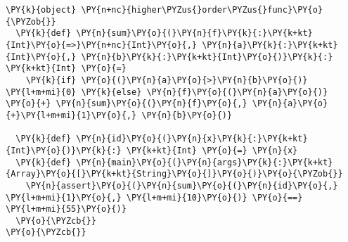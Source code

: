 \begin{Verbatim}[commandchars=\\\{\}]
\PY{k}{object} \PY{n+nc}{higher\PYZus{}order\PYZus{}func}\PY{o}{\PYZob{}}
  \PY{k}{def} \PY{n}{sum}\PY{o}{(}\PY{n}{f}\PY{k}{:}\PY{k+kt}{Int}\PY{o}{=>}\PY{n+nc}{Int}\PY{o}{,} \PY{n}{a}\PY{k}{:}\PY{k+kt}{Int}\PY{o}{,} \PY{n}{b}\PY{k}{:}\PY{k+kt}{Int}\PY{o}{)}\PY{k}{:} \PY{k+kt}{Int} \PY{o}{=}
    \PY{k}{if} \PY{o}{(}\PY{n}{a}\PY{o}{>}\PY{n}{b}\PY{o}{)} \PY{l+m+mi}{0} \PY{k}{else} \PY{n}{f}\PY{o}{(}\PY{n}{a}\PY{o}{)} \PY{o}{+} \PY{n}{sum}\PY{o}{(}\PY{n}{f}\PY{o}{,} \PY{n}{a}\PY{o}{+}\PY{l+m+mi}{1}\PY{o}{,} \PY{n}{b}\PY{o}{)}
  
  \PY{k}{def} \PY{n}{id}\PY{o}{(}\PY{n}{x}\PY{k}{:}\PY{k+kt}{Int}\PY{o}{)}\PY{k}{:} \PY{k+kt}{Int} \PY{o}{=} \PY{n}{x}
  \PY{k}{def} \PY{n}{main}\PY{o}{(}\PY{n}{args}\PY{k}{:}\PY{k+kt}{Array}\PY{o}{[}\PY{k+kt}{String}\PY{o}{]}\PY{o}{)}\PY{o}{\PYZob{}}
    \PY{n}{assert}\PY{o}{(}\PY{n}{sum}\PY{o}{(}\PY{n}{id}\PY{o}{,} \PY{l+m+mi}{1}\PY{o}{,} \PY{l+m+mi}{10}\PY{o}{)} \PY{o}{==} \PY{l+m+mi}{55}\PY{o}{)}
  \PY{o}{\PYZcb{}}
\PY{o}{\PYZcb{}}
\end{Verbatim}
